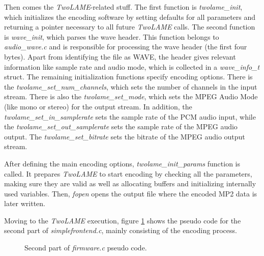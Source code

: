Then comes the \textit{TwoLAME}-related stuff. The first function is \textit{twolame\_init}, which initializes the encoding software by setting defaults for all parameters and returning a pointer necessary to all future \textit{TwoLAME} calls. The second function is \textit{wave\_init}, which parses the wave header. This function belongs to \textit{audio\_wave.c} and is responsible for processing the wave header (the first four bytes). Apart from identifying the file as WAVE, the header gives relevant information like sample rate and audio mode, which is collected in a \textit{wave\_info\_t} struct.
The remaining initialization functions specify encoding options. There is the \textit{twolame\_set\_num\_channels}, which sets the number of channels in the input stream. There is also the \textit{twolame\_set\_mode}, which sets the MPEG Audio Mode (like mono or stereo) for the output stream. In addition, the \textit{twolame\_set\_in\_samplerate} sets the sample rate of the PCM audio input, while the \textit{twolame\_set\_out\_samplerate} sets the sample rate of the MPEG audio output. The \textit{twolame\_set\_bitrate} sets the bitrate of the MPEG audio output stream.

After defining the main encoding options, \textit{twolame\_init\_params} function is called. It prepares \textit{TwoLAME} to start encoding by checking all the parameters, making sure they are valid as well as allocating buffers and initializing internally used variables. Then, \textit{fopen} opens the output file where the encoded MP2 data is later written.

Moving to the \textit{TwoLAME} execution, figure \ref{pseudo2} shows the pseudo code for the second part of \textit{simplefrontend.c}, mainly consisting of the encoding process.

\begin{figure}[H]
\centerline{}
\caption{Second part of \textit{firmware.c} pseudo code.}
\label{pseudo2}
\end{figure}



